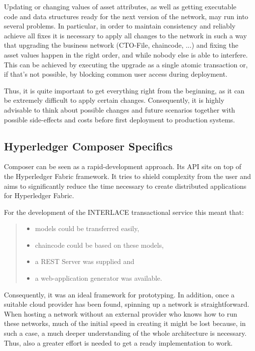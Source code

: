 Updating or changing values of asset attributes, as well as getting executable code and data structures ready for the next version of the network, may run into several problems. In particular, in order to maintain consistency and reliably achieve all fixes it is necessary to apply all changes to the network in such a way that upgrading the business network (CTO-File, chaincode, ...) and fixing the asset values happen in the right order, and while nobody else is able to interfere. This can be achieved by executing the upgrade as a single atomic transaction or, if that's not possible, by blocking common user access during deployment.

Thus, it is quite important to get everything right from the beginning, as it can be extremely difficult to apply certain changes. Consequently, it is highly advisable to think about possible changes and future scenarios together with possible side-effects and costs before first deployment to production systems.

\subsection{Hyperledger Composer Specifics}

Composer can be seen as a rapid-development approach. Its API sits on top of the Hyperledger Fabric framework. It tries to shield complexity from the user and aims to significantly reduce the time necessary to create distributed applications for Hyperledger Fabric.

For the development of the INTERLACE transactional service this meant that:
\begin{quote}
\vspace{-0.3cm}
\begin{itemize}
	\item models could be transferred easily,
	\item chaincode could be based on these models,
	\item a REST Server was supplied and
	\item a web-application generator was available.
\end{itemize}
\vspace{-0.3cm}
\end{quote}
Consequently, it was an ideal framework for prototyping. In addition, once a suitable cloud provider has been found, spinning up a network is straightforward. When hosting a network without an external provider who knows how to run these networks, much of the initial speed in creating it might be lost because, in such a case, a much deeper understanding of the whole architecture is necessary. Thus, also a greater effort is needed to get a ready implementation to work.

